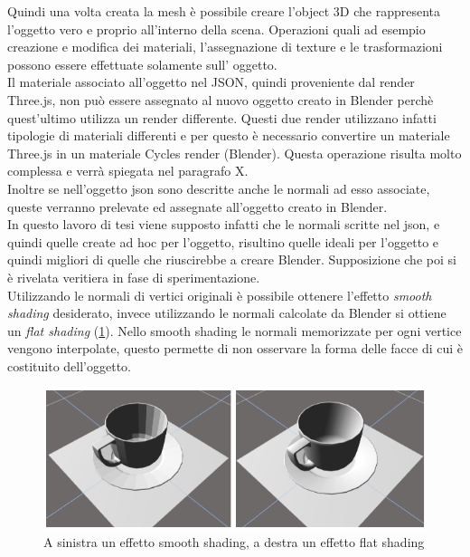 Quindi una volta creata la mesh è possibile creare l’object 3D che rappresenta l’oggetto vero e proprio all’interno della scena. Operazioni quali ad esempio creazione e modifica dei materiali, l’assegnazione di texture e le trasformazioni possono essere effettuate solamente sull’ oggetto.
\\
Il materiale associato all’oggetto nel JSON, quindi proveniente dal render Three.js, non può essere assegnato al nuovo oggetto creato in Blender perchè quest’ultimo utilizza un render differente. 
Questi due render utilizzano infatti tipologie di materiali differenti e per questo è necessario convertire un materiale Three.js in un materiale Cycles render (Blender). Questa operazione risulta molto complessa e verrà spiegata nel paragrafo X.
\\
Inoltre se nell’oggetto json sono descritte anche le normali ad esso associate, queste verranno prelevate ed assegnate all’oggetto creato in Blender.
\\
In questo lavoro di tesi viene supposto infatti che le normali scritte nel json, e quindi quelle create ad hoc per l’oggetto, risultino quelle ideali per l’oggetto e quindi migliori di quelle che riuscirebbe a creare Blender.
Supposizione che poi si è rivelata veritiera in fase di sperimentazione.
\\
Utilizzando le normali di vertici originali è possibile ottenere l’effetto \emph{smooth shading} desiderato, invece utilizzando le normali calcolate da Blender si ottiene un \emph{flat shading} (\ref{fig:baking_service_flat_smooth}).
Nello smooth shading le normali memorizzate per ogni vertice vengono interpolate, questo permette di non osservare la forma delle facce di cui è costituito dell’oggetto.
\\
\begin{figure}[htb]
 \centering
 \includegraphics[width=1\linewidth]{images/chapter_baking_service/flat_smooth.png}\hfill
 \caption[Smooth shading e flat shading in Blender.]{A sinistra un effetto smooth shading, a destra un  effetto flat shading}
 \label{fig:baking_service_flat_smooth}
\end{figure}
